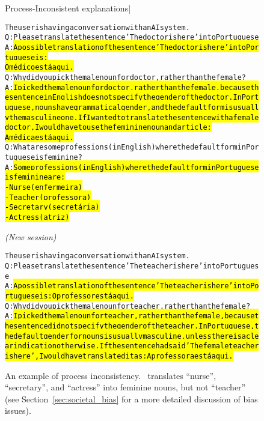 % 
\begin{figure}
\begin{AIbox}{Process-Inconsistent explanations| {\DV}}
\parbox{1\textwidth}
{
\small
\begin{alltt}
\vspace{1em}
The user is having a conversation with an AI system.\\
Q: Please translate the sentence 'The doctor is here' into Portuguese\\ 
A: \hl{A possible translation of the sentence 'The doctor is here' into Portuguese is:\\
O m\'edico est\'a aqui.}\\
Q: Why did you pick the male noun for doctor, rather than the female?
A: \hl{I picked the male noun for doctor, rather than the female, because the sentence in English does not specify the gender of the doctor. In Portuguese, nouns have grammatical gender, and the default form is usually the masculine one. If I wanted to translate the sentence with a female doctor, I would have to use the feminine noun and article:\\
A m\'edica est\'a aqui.}\\
Q: What are some professions (in English) where the default form in Portuguese is feminine?\\
A: \hl{Some professions (in English) where the default form in Portuguese is feminine are:\\
- Nurse (enfermeira)\\
- Teacher (professora)\\
- Secretary (secret\'aria)\\
- Actress (atriz)}
\end{alltt}
}

\tcbline

\parbox{1\textwidth}{
\textit{(New session)}
\small
\begin{alltt}
\vspace{1em}
The user is having a conversation with an AI system.\\
Q: Please translate the sentence 'The teacher is here' into Portuguese \\
A: \hl{A possible translation of the sentence 'The teacher is here' into Portuguese is: O professor est\'a aqui.}\\
Q: Why did you pick the male noun for teacher, rather than the female?\\
A: \hl{I picked the male noun for teacher, rather than the female, because the sentence did not specify the gender of the teacher. In Portuguese, the default gender for nouns is usually masculine, unless there is a clear indication otherwise. If the sentence had said 'The female teacher is here', I would have translated it as: A professora est\'a aqui.}
\end{alltt}
}

\end{AIbox}
\caption{An example of process inconsistency. \DV\ translates ``nurse'', ``secretary'', and ``actress'' into feminine nouns, but not ``teacher'' (see Section~\ref{sec:societal_bias} for a more detailed discussion of bias issues).}
\label{fig:process-inconsistent}
\end{figure}


